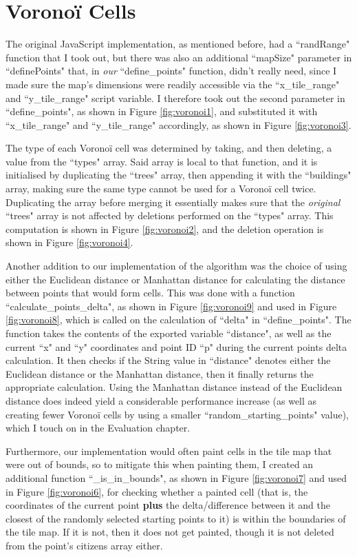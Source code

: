 \section{Voronoï Cells}

The original JavaScript implementation, as mentioned before, had a ``randRange" function that I took out, but there was also an additional ``mapSize" parameter in ``definePoints" that, in \textit{our} ``define\_points" function, didn't really need, since I made sure the map's dimensions were readily accessible via the ``x\_tile\_range" and ``y\_tile\_range" script variable. I therefore took out the second parameter in ``define\_points", as shown in Figure \ref{fig:voronoi1}, and substituted it with ``x\_tile\_range" and ``y\_tile\_range" accordingly, as shown in Figure \ref{fig:voronoi3}.

The type of each Voronoï cell was determined by taking, and then deleting, a value from the ``types" array. Said array is local to that function, and it is initialised by duplicating the ``trees" array, then appending it with the ``buildings" array, making sure the same type cannot be used for a Voronoï cell twice. Duplicating the array before merging it essentially makes sure that the \textit{original} ``trees" array is not affected by deletions performed on the ``types" array. This computation is shown in Figure \ref{fig:voronoi2}, and the deletion operation is shown in Figure \ref{fig:voronoi4}.

Another addition to our implementation of the algorithm was the choice of using either the Euclidean distance or Manhattan distance for calculating the distance between points that would form cells. This was done with a function ``calculate\_points\_delta", as shown in Figure \ref{fig:voronoi9} and used in Figure \ref{fig:voronoi8}, which is called on the calculation of ``delta" in ``define\_points". The function takes the contents of the exported variable ``distance", as well as the current ``x" and ``y" coordinates and point ID ``p" during the current points delta calculation. It then checks if the String value in ``distance" denotes either the Euclidean distance or the Manhattan distance, then it finally returns the appropriate calculation. Using the Manhattan distance instead of the Euclidean distance does indeed yield a considerable performance increase (as well as creating fewer Voronoï cells by using a smaller ``random\_starting\_points" value), which I touch on in the Evaluation chapter.

Furthermore, our implementation would often paint cells in the tile map that were out of bounds, so to mitigate this when painting them, I created an additional function ``\_is\_in\_bounds", as shown in Figure \ref{fig:voronoi7} and used in Figure \ref{fig:voronoi6}, for checking whether a painted cell (that is, the coordinates of the current point \textbf{plus} the delta/difference between it and the closest of the randomly selected starting points to it) is within the boundaries of the tile map. If it is not, then it does not get painted, though it is not deleted from the point's citizens array either.

